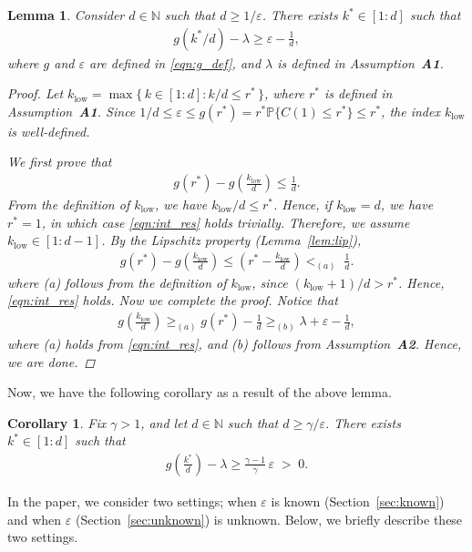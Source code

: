 \documentclass[12pt,draftcls, onecolumn]{IEEEtran}
\newcommand{\velb}{\varepsilon}
\newtheorem{lemma}{Lemma}
\newtheorem{corollary}{Corollary}[theorem]
\begin{document}
\begin{lemma}\label{eqn:key_lemma_1}
Consider $d \in \mathbb{N}$ such that $d \geq 1/\varepsilon$. There exists $k^* \in [1:d]$ such that 
\begin{align}
g\left(k^*/d\right) -\lambda \geq \varepsilon - \frac{1}{d}, \nonumber   
\end{align}
where $g$ and $\varepsilon$ are defined in \eqref{eqn:g_def}, and $\lambda$ is defined in Assumption~\textbf{A1}.
\begin{proof}
Let $k_{\mathrm{low}} = \max\bigl\{\,k\in [1:d] : k/d \le r^{*}\,\bigr\}$, where $r^*$ is defined in Assumption~\textbf{A1}.
Since \(1/{d} \le \velb \le  g(r^*) = r^*\mathbb{P}\{C(1) \leq r^*\} \le r^{*}\), the index \(k_{\mathrm{low}}\) is well‑defined.

We first prove that
\begin{align}\label{eqn:int_res}
    g(r^*) - g\left(\frac{k_{\mathrm{low}}}{d}\right) \leq \frac{1}{d}. 
\end{align}
From the definition of $k_{\mathrm{low}}$, we have \(k_{\mathrm{low}}/d \le r^{*}\). Hence, if $k_{\mathrm{low}} = d$, we have $r^* = 1$, in which case \eqref{eqn:int_res} holds trivially. Therefore, we assume $k_{\mathrm{low}}  \in [1:d-1]$. By the Lipschitz property (Lemma~\ref{lem:lip}),
\begin{align}
 g(r^*)- g\left(\frac{k_{\mathrm{low}}}{d}\right) 
\leq
\left(r^{*} - \frac{k_{\text{low}}}{d}\right)
<_{(a)}\;
\frac{1}{{d}}. \nonumber
\end{align}
where (a) follows from the definition of $k_{\text{low}}$, since $(k_{\text{low}} +1)/d > r^*$. Hence, \eqref{eqn:int_res} holds. Now we complete the proof. Notice that
\begin{align}
g\left(\frac{k_{\text{low}}}{d}\right)
\geq_{(a)}
g(r^*) -
\frac{1}{{d}}
\geq_{(b)}
\lambda + \velb-
\frac{1}{d}, \nonumber
\end{align}
where (a) holds from \eqref{eqn:int_res}, and (b) follows from Assumption~\textbf{A2}. Hence, we are done.
\end{proof}
\end{lemma}

Now, we have the following corollary as a result of the above lemma.
\begin{corollary}\label{corr:main_corr}
    Fix $\gamma > 1$, and let $d \in \mathbb{N}$ such that $d \geq \gamma/\varepsilon$.  There exists $k^* \in [1:d]$ such that 
    \begin{align}
        g\!\left(\frac{k^*}{d}\right)-\lambda \geq \frac{\gamma-1}{\gamma}\,\varepsilon \nonumber
  \;>\;0. 
    \end{align}
\end{corollary}
In the paper, we consider two settings; when $\varepsilon$ is known (Section~\ref{sec:known}) and when $\varepsilon$ (Section~\ref{sec:unknown}) is unknown. Below, we briefly describe these two settings.
\end{document}
